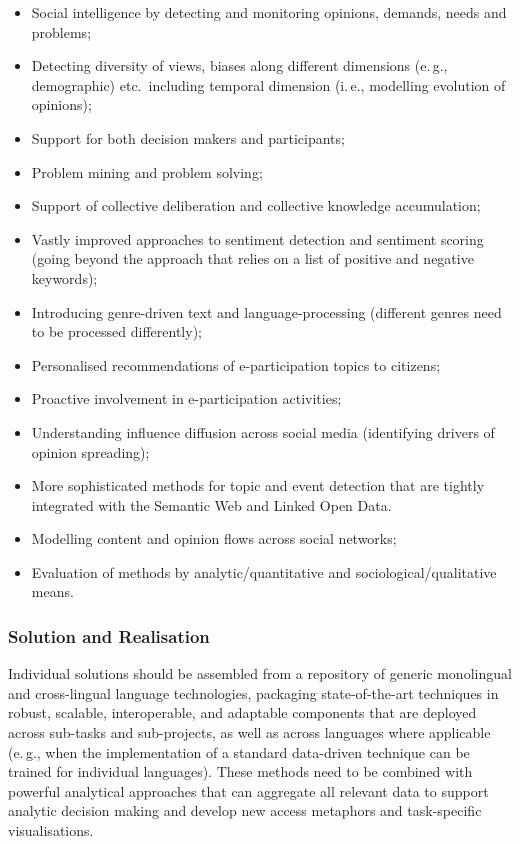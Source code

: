\documentclass[10pt, plain]{../../metanetpaper}
\begin{document}
\begin{multicols}{2}
\begin{itemize}
\item Social intelligence by detecting and monitoring opinions, demands, needs and problems;
\item Detecting diversity of views, biases along different dimensions (e.\,g., demographic) etc.~including temporal dimension (i.\,e., modelling evolution of opinions);
\item Support for both decision makers and participants;
\item Problem mining and problem solving;
\item Support of collective deliberation and collective knowledge accumulation;
\item Vastly improved approaches to sentiment detection and sentiment scoring (going beyond the approach that relies on a list of positive and negative keywords);
\item Introducing genre-driven text and language-processing (different genres need to be processed differently);
\item Personalised recommendations of e-participation topics to citizens;
\item Proactive involvement in e-participation activities;
\item Understanding influence diffusion across social media (identifying drivers of opinion spreading);
\item More sophisticated methods for topic and event detection that are tightly integrated with the Semantic Web and Linked Open Data.
\item Modelling content and opinion flows across social networks;
\item Evaluation of methods by analytic/quantitative and sociological/qualitative means.
\end{itemize}

\subsubsection{Solution and Realisation}
\label{sec:solut-techn-real-pt2}

Individual solutions should be assembled from a repository of generic monolingual and cross-lingual language technologies, packaging state-of-the-art techniques in robust, scalable, interoperable, and adaptable components that are deployed across sub-tasks and sub-projects, as well as across languages where applicable (e.\,g., when the implementation of a standard data-driven technique can be trained for individual languages). These methods need to be combined with powerful analytical approaches that can aggregate all relevant data to support analytic decision making and develop new access metaphors and task-specific visualisations.
 

\end{multicols}
\end{document}
